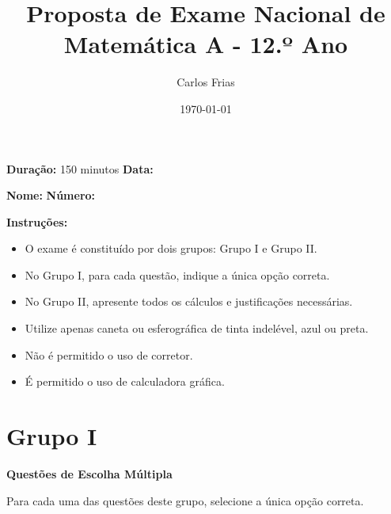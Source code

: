 \documentclass[12pt,a4paper]{exam}
\title{Proposta de Exame Nacional de Matemática A - 12.º Ano}
\author{Carlos Frias}
\date{\today}
\begin{document}
\maketitle

\textbf{Duração:} 150 minutos \hfill \textbf{Data:} \underline{\hspace{3cm}}

\textbf{Nome:} \underline{\hspace{10cm}} \hfill \textbf{Número:} \underline{\hspace{3cm}}

\textbf{Instruções:}
\begin{itemize}
    \item O exame é constituído por dois grupos: Grupo I e Grupo II.
    \item No Grupo I, para cada questão, indique a única opção correta.
    \item No Grupo II, apresente todos os cálculos e justificações necessárias.
    \item Utilize apenas caneta ou esferográfica de tinta indelével, azul ou preta.
    \item Não é permitido o uso de corretor.
    \item É permitido o uso de calculadora gráfica.
\end{itemize}

\vspace{1cm}

\section*{Grupo I}
\textbf{Questões de Escolha Múltipla}

Para cada uma das questões deste grupo, selecione a única opção correta.
\end{document}
